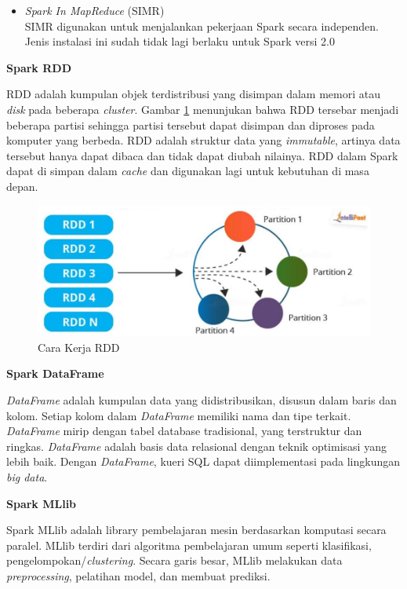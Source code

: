 \documentclass[a4paper,twoside]{article}
\begin{document}
\begin{enumerate}
\begin{itemize}
\item \textit{Spark In MapReduce} (SIMR)\\ 
SIMR digunakan untuk menjalankan pekerjaan Spark secara independen. Jenis instalasi ini sudah tidak lagi berlaku untuk Spark versi 2.0
\end{itemize}

\textbf{Spark RDD}

\par RDD adalah kumpulan objek terdistribusi yang disimpan dalam memori atau \textit{disk} pada beberapa \textit{cluster}. Gambar \ref{fig:rdd_intro} menunjukan bahwa RDD tersebar menjadi beberapa partisi sehingga partisi tersebut dapat disimpan dan diproses pada komputer yang berbeda. RDD adalah struktur data yang \textit{immutable}, artinya data tersebut hanya dapat dibaca dan tidak dapat diubah nilainya. RDD dalam Spark dapat di simpan dalam \textit{cache} dan digunakan lagi untuk kebutuhan di masa depan. 

\begin{figure}[H]
	\centering
	\includegraphics[scale=0.3]{rdd_intro}
	\caption{Cara Kerja RDD}
	\label{fig:rdd_intro}
\end{figure}

\textbf{Spark DataFrame}

\textit{DataFrame} adalah kumpulan data yang didistribusikan, disusun dalam baris dan kolom. Setiap kolom dalam \textit{DataFrame} memiliki nama dan tipe terkait. \textit{DataFrame} mirip dengan tabel database tradisional, yang terstruktur dan ringkas. \textit{DataFrame} adalah basis data relasional dengan teknik optimisasi yang lebih baik. Dengan \textit{DataFrame}, kueri SQL dapat diimplementasi pada lingkungan \textit{big data}. 
\vspace{0.5cm}

\textbf{Spark MLlib}

Spark MLlib adalah library pembelajaran mesin berdasarkan komputasi secara paralel. MLlib terdiri dari algoritma pembelajaran umum seperti klasifikasi, pengelompokan/\textit{clustering}. Secara garis besar, MLlib melakukan data \textit{preprocessing}, pelatihan model, dan membuat prediksi.


\end{enumerate}
\end{document}
